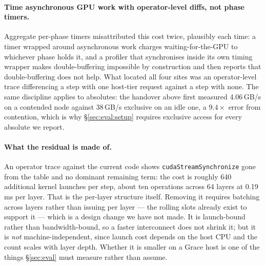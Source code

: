 \paragraph{Time asynchronous GPU work with operator-level diffs, not phase
timers.} Aggregate per-phase timers misattributed this cost twice, plausibly each
time: a timer wrapped around asynchronous work charges waiting-for-the-GPU to
whichever phase holds it, and a profiler that synchronises inside its own timing
wrapper makes double-buffering impossible by construction and then reports that
double-buffering does not help. What located all four sites was an operator-level
trace differencing a step with one host-tier request against a step with none.
The same discipline applies to absolutes: the handover above first measured
4.06\,GB/s on a contended node against 38\,GB/s exclusive on an idle one, a
$9.4\times$ error from contention, which is why \S\ref{sec:eval:setup} requires
exclusive access for every absolute we report.

\paragraph{What the residual is made of.} An operator trace against the current
code shows \texttt{cudaStreamSynchronize} gone from the table and no dominant
remaining term: the cost is roughly 640 additional kernel launches per step,
about ten operations across 64 layers at 0.19\,ms per layer. That is the
per-layer structure itself. Removing it requires batching across layers rather
than issuing per layer --- the rolling slots already exist to support it --- which
is a design change we have not made. It is launch-bound rather than
bandwidth-bound, so a faster interconnect does not shrink it; but it is
\emph{not} machine-independent, since launch cost depends on the host CPU and the
count scales with layer depth. Whether it is smaller on a Grace host is one of
the things \S\ref{sec:eval} must measure rather than assume.
